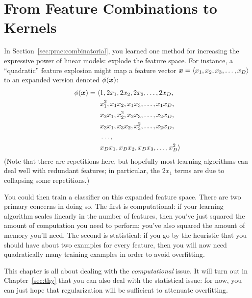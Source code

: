 \section{From Feature Combinations to Kernels}

In Section~\ref{sec:prac:combinatorial}, you learned one method for
increasing the expressive power of linear models: explode the feature
space.  For instance, a ``quadratic'' feature explosion might map a
feature vector ${\boldsymbol{x}} = \langle x_1, x_2, x_3, \dots, x_D \rangle$ to an
expanded version denoted $\phi({\boldsymbol{x}})$:
%
\begin{align}
  \phi({\boldsymbol{x}}) = \langle &1, 2x_1, 2x_2, 2x_3, \dots, 2x_D, \nonumber\\
  & x_1^2, x_1 x_2, x_1 x_3, \dots, x_1 x_D, \nonumber\\
  & x_2 x_1, x_2^2, x_2 x_3, \dots, x_2 x_D, \nonumber\\
  & x_3 x_1, x_3 x_2, x_3^2, \dots, x_2 x_D, \nonumber\\
  & \dots, \nonumber\\
  & x_D x_1, x_D x_2, x_D x_3, \dots, x_D^2 \rangle
\end{align}
%
(Note that there are repetitions here, but hopefully most learning
algorithms can deal well with redundant features; in particular, the
$2x_1$ terms are due to collapsing some repetitions.)

You could then train a classifier on this expanded feature space.
There are two primary concerns in doing so.  The first is
computational: if your learning algorithm scales linearly in the
number of features, then you've just squared the amount of computation
you need to perform; you've also squared the amount of memory you'll
need.  The second is statistical: if you go by the heuristic that you
should have about two examples for every feature, then you will now
need quadratically many training examples in order to avoid
overfitting.

This chapter is all about dealing with the \emph{computational} issue.
It will turn out in Chapter~\ref{sec:thy} that you can also deal with
the statistical issue: for now, you can just hope that regularization
will be sufficient to attenuate overfitting.


